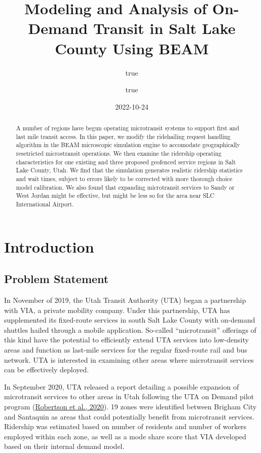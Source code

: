 \documentclass[
]{report}
\title{Modeling and Analysis of On-Demand Transit in Salt Lake County Using BEAM}
\author{true \and true}
\date{2022-10-24}
\begin{document}
\maketitle
\begin{abstract}
A number of regions have begun operating microtransit systems to support first and last mile transit access. In this paper, we modify the ridehailing request handling algorithm in the BEAM microscopic simulation engine to accomodate geographically resetricted microstransit operations. We then examine the ridership operating characteristics for one existing and three proposed geofenced service regions in Salt Lake County, Utah. We find that the simulation generates realistic ridership statistics and wait times, subject to errors likely to be corrected with more thorough choice model calibration. We also found that expanding microtransit services to Sandy or West Jordan might be effective, but might be less so for the area near SLC International Airport.
\end{abstract}

{
\setcounter{tocdepth}{1}
\tableofcontents
}
\hypertarget{introduction}{%
\chapter{Introduction}\label{introduction}}

\hypertarget{problem-statement}{%
\section{Problem Statement}\label{problem-statement}}

In November of 2019, the Utah Transit Authority (UTA) began a partnership with VIA, a private mobility company. Under this partnership, UTA has supplemented its fixed-route services in south Salt Lake County with on-demand shuttles hailed through a mobile application. So-called ``microtransit'' offerings of this kind have the potential to efficiently extend UTA services into low-density areas and function as last-mile services for the regular fixed-route rail and bus network. UTA is interested in examining other areas where microtransit services can be effectively deployed.

In September 2020, UTA released a report detailing a possible expansion of microtransit services to other areas in Utah following the UTA on Demand pilot program (\protect\hyperlink{ref-UTAreport}{Robertson et al., 2020}). 19 zones were identified between Brigham City and Santaquin as areas that could potentially benefit from microtransit services. Ridership was estimated based on number of residents and number of workers employed within each zone, as well as a mode share score that VIA developed based on their internal demand model.
\end{document}
